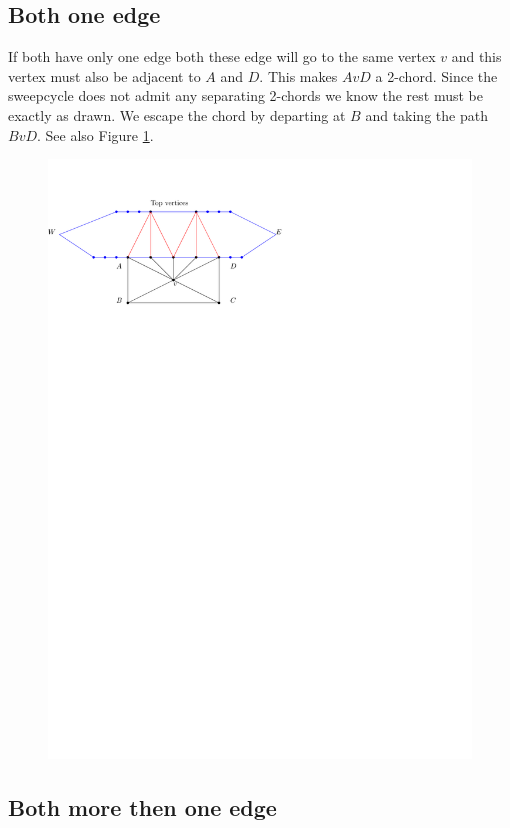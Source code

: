 \subsection{Both one edge}

If both have only one edge both these edge will go to the same vertex $v$ and this vertex must also be adjacent to $A$ and $D$. This makes $AvD$ a 2-chord. Since the sweepcycle does not admit any separating 2-chords we know the rest must be exactly as drawn. We escape the chord by departing at $B$ and taking the path $BvD$.
See also Figure \ref{fig:chord:oneonefan}.

\begin{figure}[h]
  \centering
  \includegraphics[scale=1]{chordShrink/img/oneonefan}
  \caption{}
  \label{fig:chord:oneonefan}
\end{figure}


\subsection{Both more then one edge}

